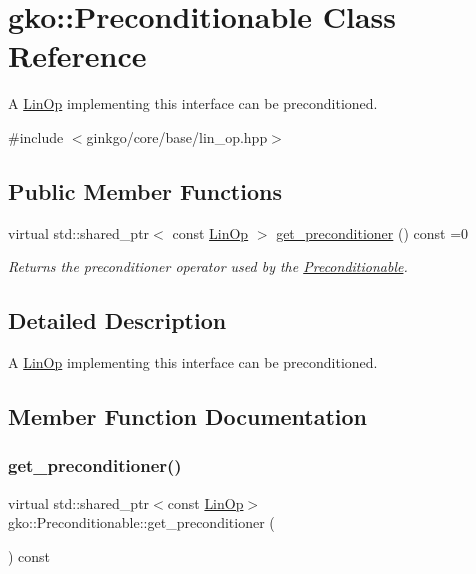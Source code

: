 \hypertarget{classgko_1_1Preconditionable}{}\section{gko\+:\+:Preconditionable Class Reference}
\label{classgko_1_1Preconditionable}


A \hyperlink{classgko_1_1LinOp}{Lin\+Op} implementing this interface can be preconditioned.  




{\ttfamily \#include $<$ginkgo/core/base/lin\+\_\+op.\+hpp$>$}

\subsection*{Public Member Functions}
\begin{DoxyCompactItemize}
\item 
virtual std\+::shared\+\_\+ptr$<$ const \hyperlink{classgko_1_1LinOp}{Lin\+Op} $>$ \hyperlink{classgko_1_1Preconditionable_ad9545089aef0dfc83bc7a74e5bf1d748}{get\+\_\+preconditioner} () const =0
\begin{DoxyCompactList}\small\item\em Returns the preconditioner operator used by the \hyperlink{classgko_1_1Preconditionable}{Preconditionable}. \end{DoxyCompactList}\end{DoxyCompactItemize}


\subsection{Detailed Description}
A \hyperlink{classgko_1_1LinOp}{Lin\+Op} implementing this interface can be preconditioned. 

\subsection{Member Function Documentation}
\mbox{\label{classgko_1_1Preconditionable_ad9545089aef0dfc83bc7a74e5bf1d748}} 
\subsubsection{\texorpdfstring{get\+\_\+preconditioner()}{get\_preconditioner()}}
{\footnotesize\ttfamily virtual std\+::shared\+\_\+ptr$<$const \hyperlink{classgko_1_1LinOp}{Lin\+Op}$>$ gko\+::\+Preconditionable\+::get\+\_\+preconditioner (\begin{DoxyParamCaption}{ }\end{DoxyParamCaption}) const\hspace{0.3cm}{\ttfamily [pure virtual]}}



